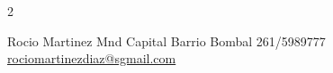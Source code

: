 \documentclass[lighthipster]{simplehipstercv}
\newlength{\rightcolwidth}
\begin{document}
\begin{paracol}{2}
\begin{minipage}[t]{0.3\textwidth}
\end{minipage}\hfill
\begin{minipage}[t]{0.3\textwidth}

\bigskip


\end{minipage}






\vfill{} %

\setlength{\parindent}{0pt}
\begin{minipage}[t]{\rightcolwidth}
\begin{center}\fontfamily{\sfdefault}\selectfont \color{black!70}
{\small Rocio Martinez  Mnd Capital  Barrio Bombal  261/5989777 \newline{} \protect\url{rociomartinezdiaz@sgmail.com}
}
\end{center}
\end{minipage}

\end{paracol}
\end{document}
